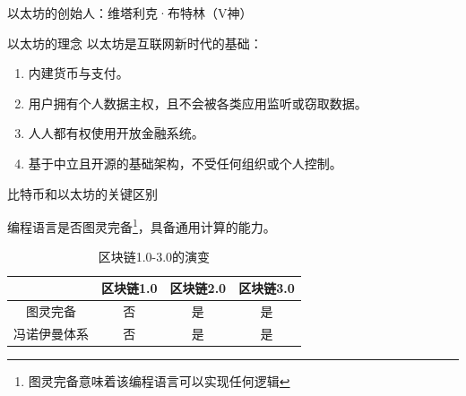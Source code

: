 \documentclass[11pt]{beamer}
\begin{document}
\begin{frame}{以太坊的创始人：维塔利克·布特林（V神）}
\begin{minipage}[t]{0.3\linewidth}
\begin{figure}
{\begin{minipage}[b]{0.8\linewidth}
				\end{minipage}%
			}
		\end{figure}
	\end{minipage}%
\end{frame}

\begin{frame}{以太坊的理念}
	以太坊是互联网新时代的基础：
	\begin{enumerate}
		\item 内建货币与支付。
		\item 用户拥有个人数据主权，且不会被各类应用监听或窃取数据。
		\item 人人都有权使用开放金融系统。
		\item 基于中立且开源的基础架构，不受任何组织或个人控制。
	\end{enumerate}
\end{frame}

\begin{frame}{比特币和以太坊的关键区别}

	编程语言是否图灵完备\footnote{图灵完备意味着该编程语言可以实现任何逻辑}，具备通用计算的能力。

	\begin{table}[htb]
		\label{table:blockchainGeneration}
		\centering
		\begin{tabular}{c|ccc}
			\hline
			             & 区块链1.0 & 区块链2.0 & 区块链3.0 \\
			\hline
			图灵完备     & 否        & 是        & 是        \\
			冯诺伊曼体系 & 否        & 是        & 是        \\
			\hline
		\end{tabular}
		\caption{区块链1.0-3.0的演变}
	\end{table}
\end{frame}
\end{document}
